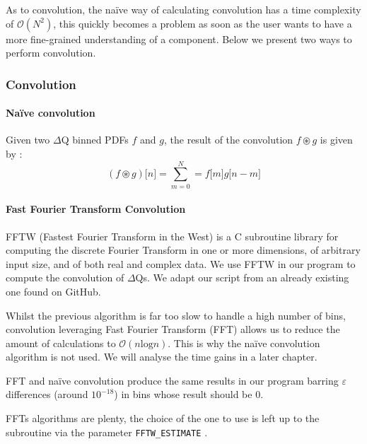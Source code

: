     As to convolution, the naïve way of calculating convolution has a time complexity of $\mathcal{O}(N^2)$, this quickly becomes a problem as soon as the user wants to have a more fine-grained understanding of a component. Below we present two ways to perform convolution.

        \subsubsection{Convolution} \label{convol}
        
        \paragraph{Naïve convolution}
        Given two $\Delta$Q binned PDFs $f$ and $g$, the result of the convolution $f \circledast g$ is given by \cite{conv}: 
        \begin{equation}
            (f \circledast g)\lbrack n \rbrack = \sum_{m = 0}^{N} = f\lbrack m \rbrack g \lbrack n - m \rbrack  
            \label{eq:discconv}
        \end{equation}
 
    \paragraph{Fast Fourier Transform Convolution}
        FFTW (Fastest Fourier Transform in the West) is a C subroutine library \cite{fftw3} for computing the discrete Fourier Transform in one or more dimensions, of arbitrary input size, and of both real and complex data. We use FFTW in our program to compute the convolution of $\Delta$Qs. We adapt our script from an already existing one found on GitHub. \cite{fft}
    
    Whilst the previous algorithm is far too slow to handle a high number of bins, convolution leveraging Fast Fourier Transform (FFT) allows us to reduce the amount of calculations to $\mathcal{O}(n \text{log} n)$. This is why the naïve convolution algorithm is not used. We will analyse the time gains in a later chapter.
    
    FFT and naïve convolution produce the same results in our program barring $\varepsilon$ differences (around $10^{-18}$) in bins whose result should be 0.
    
    FFTs algorithms are plenty, the choice of the one to use is left up to the subroutine via the parameter \texttt{FFTW\_ESTIMATE} \cite{fft-h}.

